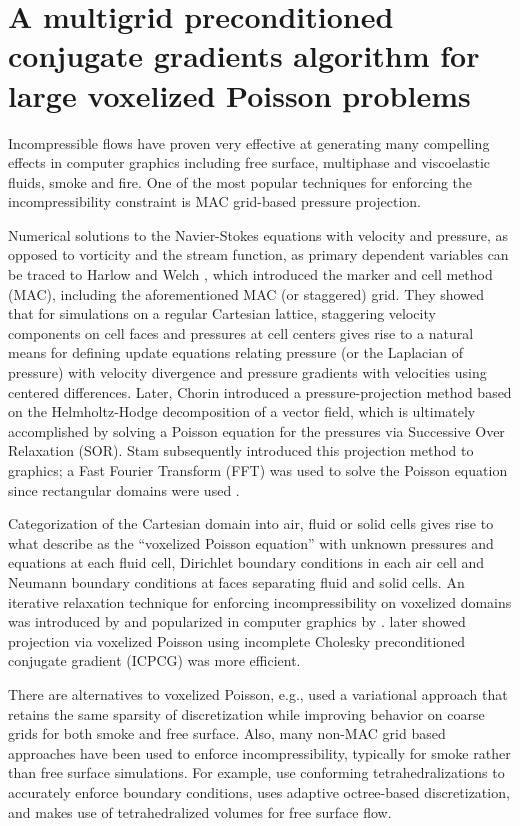 \chapter{A multigrid preconditioned conjugate gradients algorithm for large voxelized Poisson problems}\label{chap:poisson}

Incompressible flows have proven very effective at generating many
compelling effects in computer graphics including free surface,
multiphase and viscoelastic fluids, smoke and fire. One of the most
popular techniques for enforcing the incompressibility constraint is
MAC grid-based pressure projection. 

Numerical solutions to the
Navier-Stokes equations with velocity and pressure, as opposed to
vorticity and the stream function, as primary dependent variables can
be traced to Harlow and Welch \cite{Harlow:1965:MAC}, which introduced the marker and
cell method (MAC), including the aforementioned MAC (or staggered)
grid.  They showed that for simulations on a regular Cartesian lattice, staggering
velocity components on cell faces and pressures at cell centers gives
rise to a natural means for defining update equations
relating pressure (or the Laplacian of pressure) with velocity
divergence and pressure gradients with velocities using centered
differences.  Later, Chorin \cite{chorin:1968:NS} introduced a
pressure-projection method based on the Helmholtz-Hodge decomposition
of a vector field, which is ultimately accomplished by solving a
Poisson equation for the pressures via Successive Over Relaxation
(SOR).  Stam subsequently introduced this projection method to
graphics; a Fast Fourier Transform (FFT) was used to solve the Poisson
equation since rectangular domains were used \cite{Stam:1999:SF}.

Categorization of the Cartesian domain into air,
fluid or solid cells gives rise to what \cite{BBB07} describe as the ``voxelized Poisson equation'' with unknown pressures and equations at each fluid cell, Dirichlet boundary conditions
in each air cell and Neumann boundary conditions at faces separating
fluid and solid cells. An iterative relaxation technique for enforcing
incompressibility on voxelized domains was introduced by
\cite{nichols:1972:freesurface} and 
popularized in computer graphics by
\cite{Foster:1996:RAO}. \cite{FF01} later showed projection via
voxelized Poisson using incomplete Cholesky preconditioned conjugate
gradient (ICPCG) was more efficient. 


There are alternatives to voxelized Poisson, e.g., \cite{BBB07} used a variational approach that retains the same sparsity of discretization while improving behavior on coarse grids for both smoke and free surface. Also, many non-MAC grid based approaches have been used to enforce incompressibility, typically for smoke rather than free surface simulations. For example, \cite{MCPTD09,KFCO06,FOK05,ETKSD07} use conforming tetrahedralizations to accurately enforce boundary conditions, \cite{LGF04} uses adaptive octree-based discretization, and \cite{CNF07} makes use of tetrahedralized volumes for free surface flow.

